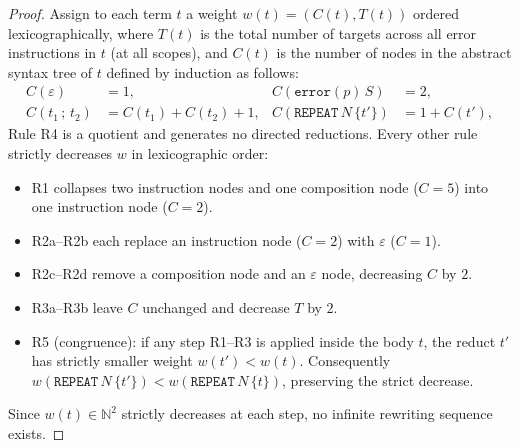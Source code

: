 \documentclass[10pt,a4paper]{amsart}
\begin{document}
\begin{proof}
Assign to each term $t$ a weight $w(t) = (C(t), T(t))$ ordered lexicographically, where $T(t)$ is the total number of targets across all error instructions in $t$ (at all scopes), and $C(t)$ is the number of nodes in the abstract syntax tree of $t$ defined by induction as follows:
\begin{align*}
  C(\varepsilon) &= 1, &
  C(\mathtt{error}(p)\,S) &= 2, \\
  C(t_1\,;\,t_2) &= C(t_1)+C(t_2)+1, &
  C(\mathtt{REPEAT}\,N\,\{t'\}) &= 1+C(t'),
\end{align*}
Rule R4 is a quotient and generates no directed reductions. Every other rule strictly decreases $w$ in lexicographic order:
\begin{itemize}
  \item R1 collapses two instruction nodes and one composition node ($C = 5$) into one instruction node ($C = 2$).
  \item R2a--R2b each replace an instruction node ($C = 2$) with $\varepsilon$ ($C = 1$).
  \item R2c--R2d remove a composition node and an $\varepsilon$ node, decreasing $C$ by $2$.
  \item R3a--R3b leave $C$ unchanged and decrease $T$ by $2$.
  \item R5 (congruence): if any step R1--R3 is applied inside the body $t$, the reduct $t'$ has strictly smaller weight $w(t') < w(t)$. Consequently $w(\mathtt{REPEAT}\,N\,\{t'\}) < w(\mathtt{REPEAT}\,N\,\{t\})$, preserving the strict decrease.
\end{itemize}
Since $w(t) \in \mathbb{N}^2$ strictly decreases at each step, no infinite rewriting sequence exists.
\end{proof}
\end{document}
